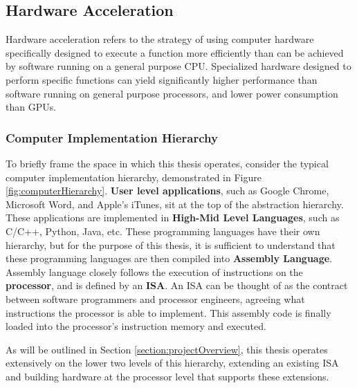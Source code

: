 
\subsection{Hardware Acceleration}
    Hardware acceleration refers to the strategy of using computer hardware specifically designed to execute a function more efficiently than can be achieved by software running on a general purpose \ac{CPU}.
    Specialized hardware designed to perform specific functions can yield significantly higher performance than software running on general purpose processors, and lower power consumption than \ac{GPU}s.

    \subsubsection*{Computer Implementation Hierarchy}
        To briefly frame the space in which this thesis operates, consider the typical computer implementation hierarchy, demonstrated in Figure \ref{fig:computerHierarchy}. \textbf{User level applications}, such as Google Chrome, Microsoft Word, and Apple's iTunes, sit at the top of the abstraction hierarchy. These applications are implemented in \textbf{High-Mid Level Languages}, such as C/C++, Python, Java, etc. These programming languages have their own hierarchy, but for the purpose of this thesis, it is sufficient to understand that these programming languages are then compiled into \textbf{Assembly Language}. Assembly language closely follows the execution of instructions on the \textbf{processor}, and is defined by an \textbf{\ac{ISA}}. An \ac{ISA} can be thought of as the contract between software programmers and processor engineers, agreeing what instructions the processor is able to implement. This assembly code is finally loaded into the processor's instruction memory and executed. 
        
        As will be outlined in Section \ref{section:projectOverview}, this thesis operates extensively on the lower two levels of this hierarchy, extending an existing \ac{ISA} and building hardware at the processor level that supports these extensions.

